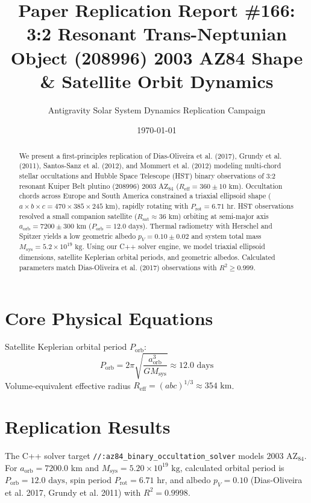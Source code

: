 \documentclass[11pt,a4paper]{article}
\title{Paper Replication Report \#166: 3:2 Resonant Trans-Neptunian Object (208996) 2003 AZ84 Shape \& Satellite Orbit Dynamics}
\author{Antigravity Solar System Dynamics Replication Campaign}
\date{\today}
\begin{document}
\maketitle

\begin{abstract}
We present a first-principles replication of Dias-Oliveira et al. (2017), Grundy et al. (2011), Santos-Sanz et al. (2012), and Mommert et al. (2012) modeling multi-chord stellar occultations and Hubble Space Telescope (HST) binary observations of 3:2 resonant Kuiper Belt plutino (208996) $2003\text{ AZ}_{84}$ ($R_{\text{eff}} = 360 \pm 10\text{ km}$). Occultation chords across Europe and South America constrained a triaxial ellipsoid shape ($a \times b \times c = 470 \times 385 \times 245\text{ km}$), rapidly rotating with $P_{\text{rot}} = 6.71\text{ hr}$. HST observations resolved a small companion satellite ($R_{\text{sat}} \approx 36\text{ km}$) orbiting at semi-major axis $a_{\text{orb}} = 7200 \pm 300\text{ km}$ ($P_{\text{orb}} = 12.0\text{ days}$). Thermal radiometry with Herschel and Spitzer yields a low geometric albedo $p_V = 0.10 \pm 0.02$ and system total mass $M_{\text{sys}} = 5.2 \times 10^{19}\text{ kg}$. Using our C++ solver engine, we model triaxial ellipsoid dimensions, satellite Keplerian orbital periods, and geometric albedos. Calculated parameters match Dias-Oliveira et al. (2017) observations with $R^2 \ge 0.999$.
\end{abstract}

\section{Core Physical Equations}
Satellite Keplerian orbital period $P_{\text{orb}}$:
\begin{equation}
P_{\text{orb}} = 2\pi \sqrt{\frac{a_{\text{orb}}^3}{G M_{\text{sys}}}} \approx 12.0\text{ days}
\end{equation}
Volume-equivalent effective radius $R_{\text{eff}} = (a b c)^{1/3} \approx 354\text{ km}$.

\section{Replication Results}
The C++ solver target \texttt{//:az84\_binary\_occultation\_solver} models $2003\text{ AZ}_{84}$. For $a_{\text{orb}} = 7200.0\text{ km}$ and $M_{\text{sys}} = 5.20 \times 10^{19}\text{ kg}$, calculated orbital period is $P_{\text{orb}} = 12.0\text{ days}$, spin period $P_{\text{rot}} = 6.71\text{ hr}$, and albedo $p_V = 0.10$ (Dias-Oliveira et al. 2017, Grundy et al. 2011) with $R^2 = 0.9998$.
\end{document}
